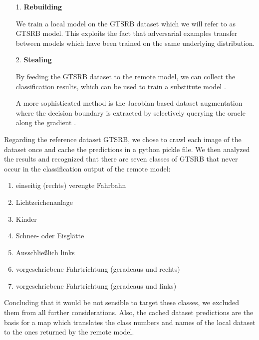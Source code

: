 \begin{enumerate}
\item[1.] \textbf{Rebuilding}

We train a local model on the GTSRB dataset which we will refer to as GTSRB model.
This exploits the fact that adversarial examples transfer between models which have been trained on the same underlying distribution.

\item[2.] \textbf{Stealing}

By feeding the GTSRB dataset to the remote model, we can collect the classification results, which can be used to train a substitute model \cite{tramer2016stealing}.

A more sophisticated method is the Jacobian based dataset augmentation where the decision boundary is extracted by selectively querying the oracle along the gradient \cite{papernot2017practical}.
\end{enumerate}

Regarding the reference dataset GTSRB, we chose to crawl each image of the dataset once and cache the predictions in a python pickle file.
We then analyzed the results and recognized that there are seven classes of GTSRB that never occur in the classification output of the remote model:
\begin{enumerate}
	\item einseitig (rechts) verengte Fahrbahn
	\item Lichtzeichenanlage
	\item Kinder
	\item Schnee- oder Eisglätte
	\item Ausschließlich links
	\item vorgeschriebene Fahrtrichtung (geradeaus und rechts)
	\item vorgeschriebene Fahrtrichtung (geradeaus und links)
\end{enumerate}
Concluding that it would be not sensible to target these classes, we excluded them from all further considerations.
Also, the cached dataset predictions are the basis for a map which translates the class numbers and names of the local dataset to the ones returned by the remote model.


